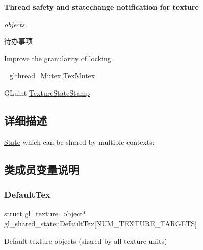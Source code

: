 \begin{Indent}\textbf{ Thread safety and statechange notification for texture}\par
{\em objects.

\begin{DoxyRefDesc}{待办事项}
\item[\hyperlink{todo__todo000005}{待办事项}]Improve the granularity of locking. \end{DoxyRefDesc}
}\begin{DoxyCompactItemize}
\item 
\hyperlink{struct___c_r_i_t_i_c_a_l___s_e_c_t_i_o_n}{\+\_\+glthread\+\_\+\+Mutex} \hyperlink{structgl__shared__state_a8a687c018bb540987db7ca181c522b6f}{Tex\+Mutex}
\item 
G\+Luint \hyperlink{structgl__shared__state_aadfde9b62cb193b3a2852566f61fff9d}{Texture\+State\+Stamp}
\end{DoxyCompactItemize}
\end{Indent}


\subsection{详细描述}
\hyperlink{struct_state}{State} which can be shared by multiple contexts\+: 

\subsection{类成员变量说明}
\mbox{\label{structgl__shared__state_ac0afd416c85bcc8e88df36c20fac03e6}} 
\subsubsection{\texorpdfstring{Default\+Tex}{DefaultTex}}
{\footnotesize\ttfamily \hyperlink{interfacestruct}{struct} \hyperlink{structgl__texture__object}{gl\+\_\+texture\+\_\+object}$\ast$ gl\+\_\+shared\+\_\+state\+::\+Default\+Tex\mbox{[}N\+U\+M\+\_\+\+T\+E\+X\+T\+U\+R\+E\+\_\+\+T\+A\+R\+G\+E\+TS\mbox{]}}

Default texture objects (shared by all texture units) \mbox{\label{structgl__shared__state_a27d2206482abf69a1e034d52695aa3fd}} 
